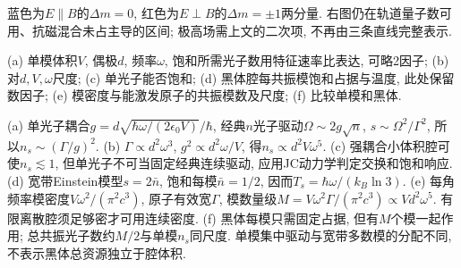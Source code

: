 \begin{center}\end{center}
蓝色为$E\parallel B$的$\Delta m=0$, 红色为$E\perp B$的$\Delta m=\pm1$两分量. 右图仍在轨道量子数可用、抗磁混合未占主导的区间; 极高场需上文的二次项, 不再由三条直线完整表示.

\begin{exercise}(a) 单模体积$V$, 偶极$d$, 频率$\omega$, 饱和所需光子数用特征速率比表达, 可略2因子; (b) 对$d,V,\omega$尺度; (c) 单光子能否饱和; (d) 黑体腔每共振模饱和占据与温度, 此处保留数因子; (e) 模密度与能激发原子的共振模数及尺度; (f) 比较单模和黑体.\end{exercise}
\begin{solution}(a) 单光子耦合$g=d\sqrt{\hbar\omega/(2\epsilon_0V)}/\hbar$, 经典$n$光子驱动$\Omega\sim2g\sqrt n$, $s\sim\Omega^2/\Gamma^2$, 所以$n_s\sim(\Gamma/g)^2$. (b) $\Gamma\propto d^2\omega^3$, $g^2\propto d^2\omega/V$, 得$n_s\propto d^2V\omega^5$. (c) 强耦合小体积腔可使$n_s\lesssim1$, 但单光子不可当固定经典连续驱动, 应用JC动力学判定交换和饱和响应. (d) 宽带Einstein模型$s=2\bar n$, 饱和每模$\bar n=1/2$, 因而$T_s=\hbar\omega/(k_B\ln3)$. (e) 每角频率模密度$V\omega^2/(\pi^2c^3)$, 原子有效宽$\Gamma$, 模数量级$M=V\omega^2\Gamma/(\pi^2c^3)\propto Vd^2\omega^5$. 有限离散腔须足够密才可用连续密度. (f) 黑体每模只需固定占据, 但有$M$个模一起作用; 总共振光子数约$M/2$与单模$n_s$同尺度. 单模集中驱动与宽带多数模的分配不同, 不表示黑体总资源独立于腔体积.
\end{solution}
